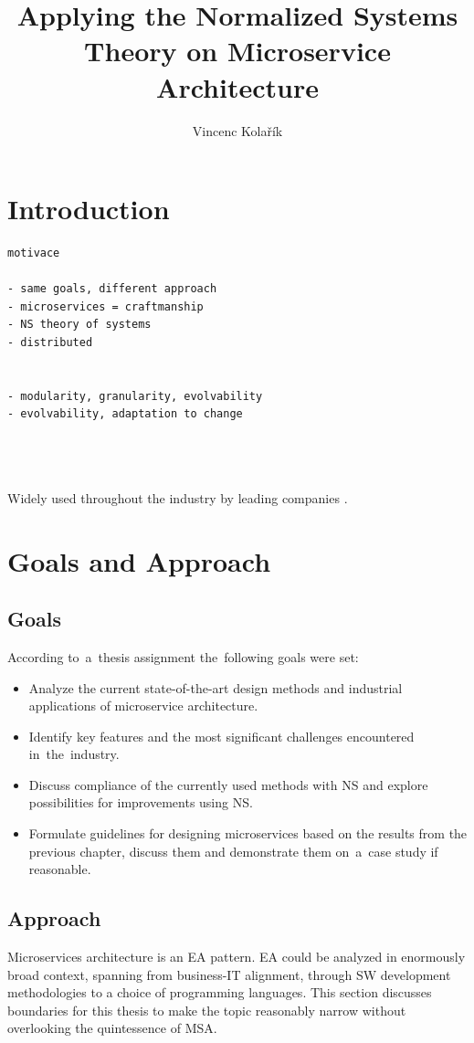\documentclass[thesis=M,english,hidelinks]{FITthesis}[2012/10/20]
\title{Applying the Normalized Systems Theory on Microservice Architecture}
\author{Vincenc Kolařík} %
\begin{document}
% 
% 
\chapter{Introduction}
\begin{verbatim}
motivace

- same goals, different approach
- microservices = craftmanship
- NS theory of systems
- distributed 


- modularity, granularity, evolvability
- evolvability, adaptation to change
    
    
    
\end{verbatim}

Widely used throughout the industry by leading companies \cite{ms-who-is-using}.


% 
% 
\chapter{Goals and Approach}
\section{Goals}
According to~a~thesis assignment the~following goals were set:
\begin{itemize}
	\item Analyze the current state-of-the-art design methods and industrial applications of microservice architecture.
	\item Identify key features and the most significant challenges encountered in~the~industry.
	\item Discuss compliance of the currently used methods with \acrlong{NS} and explore possibilities for improvements using \acrshort{NS}. 
	\item Formulate guidelines for designing microservices based on the results from the previous chapter, discuss them and demonstrate them on~a~case study if reasonable.
\end{itemize}

\section{Approach}
Microservices architecture is an \acrfull{EA} pattern. \acrshort{EA} could be analyzed in enormously broad context, spanning from business-IT alignment, through \acrshort{SW} development methodologies to a choice of programming languages. This section discusses boundaries for this thesis to make the topic reasonably narrow without overlooking the quintessence of \acrlong{MSA}.
\end{document}
